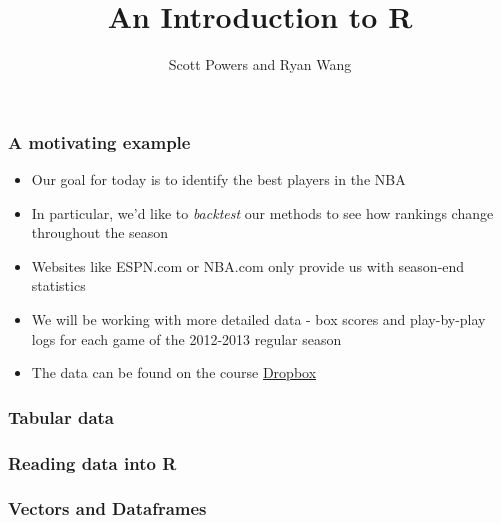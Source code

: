 \documentclass{beamer}
\title{An Introduction to R}
\author{Scott Powers and Ryan Wang}
\begin{document}
\begin{frame}
\titlepage
\end{frame}

\begin{frame}
\frametitle{A motivating example}
\begin{itemize}
	\item Our goal for today is to identify the best players in the NBA
	\item In particular, we'd like to \emph{backtest} our methods to see how rankings change throughout the season
	\item Websites like ESPN.com or NBA.com only provide us with season-end statistics
	\item We will be working with more detailed data - box scores and play-by-play logs for each game of the 2012-2013 regular season
	\item The data can be found on the course \href{https://www.dropbox.com/sh/bpl1oz5fkx3ml1s/rJVUljAoNC}{Dropbox}
\end{itemize}
\end{frame}


\begin{frame}
\frametitle{Tabular data}
\end{frame}

\begin{frame}
\frametitle{Reading data into R}
\end{frame}

\begin{frame}
\frametitle{Vectors and Dataframes}
\end{frame}
\end{document}
